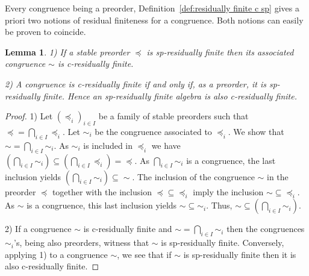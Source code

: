 \documentclass[11pt,a4paper]{article}
\newtheorem{lemma}[theorem]{Lemma}
\theoremstyle{definition} %
\newcommand\+[1]{\mathcal{#1}} %
\begin{document}
 Every congruence being a preorder, 
Definition~\ref{def:residually finite c sp} gives a priori two notions of
residual finiteness for a congruence. Both notions can easily be proven to coincide.
\begin{lemma}\label{l:p residually finite implies c}
1) If a stable preorder $\preceq$ is sp-residually finite then its associated congruence $\sim$
is c-residually finite.

2) A congruence is c-residually finite if and only if, as a preorder, it is sp-residually finite. Hence an sp-residually finite algebra is also c-residually finite.
\end{lemma}

\begin{proof}
1) Let $(\preceq_i)_{i\in I}$ be a family of stable preorders such that ${\preceq}={\bigcap_{i\in I} \preceq_i}$.
Let $\sim_i$ be the congruence associated to $\preceq_i$.
We show that ${\sim}={\bigcap_{i\in I} \sim_i}$.
As $\sim_i$ is included in $\preceq_i$ we have
$(\bigcap_{i\in I} \sim_i) \subseteq (\bigcap_{i\in I} \preceq_i) = {\preceq}$.
As $\bigcap_{i\in I} \sim_i$ is a congruence, the last inclusion yields
$(\bigcap_{i\in I} \sim_i) \subseteq {\sim}$.
The inclusion of the congruence $\sim$ in the preorder $\preceq$ 
together with the inclusion ${\preceq}\subseteq{\preceq_i}$  imply 
the inclusion ${\sim} \subseteq {\preceq_i}$.
As $\sim$ is a congruence, this last inclusion yields ${\sim} \subseteq {\sim_i}$.
Thus, ${\sim} \subseteq (\bigcap_{i\in I} \sim_i)$.

2) If a congruence $\sim$ is c-residually finite and 
${\sim}=\bigcap_{i\in I}\sim_i$ then the congruences $\sim_i$'s, being also preorders,
witness that $\sim$ is sp-residually finite. 
Conversely, applying 1) to a congruence $\sim$, we see that if $\sim$ is sp-residually finite
then it is also c-residually finite.
\end{proof}
\fi
\end{document}
